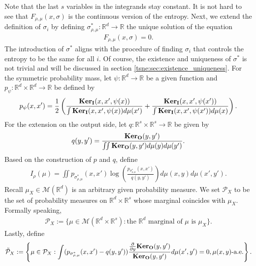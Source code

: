 Note that the last $s$ variables in the integrands stay constant. It is not hard to see that $F_{\rho,\mu}(x,\sigma)$ is the continuous version of the entropy. Next, we extend the definition of $\sigma_i$ by defining $\sigma^*_{\rho,\mu} : \mathbb{R}^d \to \mathbb{R}$ the unique solution of the equation
\begin{align}
    F_{\rho,\mu}(x,\sigma) = 0.
\end{align}
The introduction of $\sigma^*$ aligns with the procedure of finding $\sigma_i$ that controls the entropy to be the same for all $i$. Of course, the existence and uniqueness of $\sigma^*$ is not trivial and will be discussed in section \ref{tsne:sec:existence_uniqueness}. For the symmetric probability mass, let $\psi: \mathbb{R}^d \to \mathbb{R}$ be a given function and $p_{\psi}: \mathbb{R}^d \times \mathbb{R}^d \to \mathbb{R}$ be defined by
\begin{align}
    p_{\psi}(x,x') = \frac{1}{2}\left( \frac{\mathbf{Ker}_{\mathbf{I}}(x,x',\psi(x))}{\int \mathbf{Ker}_{\mathbf{I}}(x,x',\psi(x))d\mu(x')} + \frac{\mathbf{Ker}_{\mathbf{I}}(x,x',\psi(x'))}{\int \mathbf{Ker}_{\mathbf{I}}(x,x',\psi(x'))d\mu(x)}\right).
\end{align}
For the extension on the output side, let $q: \mathbb{R}^s \times \mathbb{R}^s \to \mathbb{R}$ be given by
\begin{align}
    q(y,y') = \frac{\mathbf{Ker}_{\mathbf{O}}(y,y')}{\iint \mathbf{Ker}_{\mathbf{O}}(y,y')d\mu(y) d\mu(y')}.
\end{align}
Based on the construction of $p$ and $q$, define
\begin{align}
    I_{\rho}(\mu) = \iint p_{\sigma^*_{\rho,\mu}}(x,x') \log\left(\frac{p_{\sigma^*_{\rho,\mu}}(x,x')}{q(y,y')}\right) d\mu(x,y) d\mu(x',y').
\end{align}
Recall $\mu_X \in \mathcal{M}(\mathbb{R}^d)$ is an arbitrary given probability measure. We set $\mathcal{P}_X$ to be the set of probability measures on $\mathbb{R}^d \times \mathbb{R}^s$ whose marginal coincides with $\mu_X$. Formally speaking,
\begin{align}
    \mathcal{P}_X := \{\mu \in \mathcal{M}(\mathbb{R}^d \times \mathbb{R}^s): \text{the $\mathbb{R}^d$ marginal of $\mu$ is $\mu_X$}\}.
\end{align}
Lastly, define
\begin{align}
    \tilde{\mathcal{P}}_X := \left\{ \mu \in \mathcal{P}_X: \int (p_{\sigma^*_{\rho,\mu}}(x,x')-q(y,y'))\frac{\frac{\partial}{\partial y}\mathbf{Ker}_{\mathbf{O}}{(y,y')}}{\mathbf{Ker}_{\mathbf{O}}{(y,y')}} d\mu(x',y') = 0,\mu(x,y)\text{-a.e.}\right\}.
\end{align}
